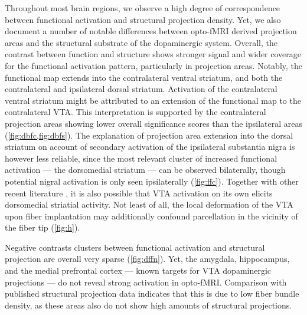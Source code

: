 Throughout most brain regions, we observe a high degree of correspondence between functional activation and structural projection density.
Yet, we also document a number of notable differences between opto-fMRI derived projection areas and the structural substrate of the dopaminergic system.
Overall, the contrast between function and structure shows stronger signal and wider coverage for the functional activation pattern, particularly in projection areas.
Notably, the functional map extends into the contralateral ventral striatum, and both the contralateral and ipsilateral dorsal striatum.
Activation of the contralateral ventral striatum might be attributed to an extension of the functional map to the contralateral VTA.
This interpretation is supported by the contralateral projection areas showing lower overall significance scores than the ipsilateral areas (\cref{fig:dbfc,fig:dbfs}).
The explanation of projection area extension into the dorsal striatum on account of secondary activation of the ipsilateral substantia nigra is however less reliable, since the most relevant cluster of increased functional activation --- the dorsomedial striatum --- can be observed bilaterally, though potential nigral activation is only seen ipsilaterally (\cref{fig:ffc}).
Together with other recent literature \cite{Lohani2016,Pan2010}, it is also possible that VTA activation on its own elicits dorsomedial striatial activity.
Not least of all, the local deformation of the VTA upon fiber implantation may additionally confound parcellation in the vicinity of the fiber tip (\cref{fig:h}).


Negative contrasts clusters between functional activation and structural projection are overall very sparse (\cref{fig:dffn}).
Yet, the amygdala, hippocampus, and the medial prefrontal cortex --- known targets for VTA dopaminergic projections --- do not reveal strong activation in opto-fMRI.
Comparison with published structural projection data indicates that this is due to low fiber bundle density, as these areas also do not show high amounts of structural projections.

